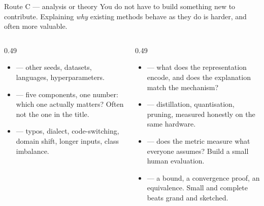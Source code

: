 \documentclass[aspectratio=169,11pt]{beamer}
\begin{document}
\begin{frame}{Route C --- analysis or theory}
You do not have to build something new to contribute. Explaining \emph{why}
existing methods behave as they do is harder, and often more valuable.

\vspace{3mm}
\begin{columns}[T]
\begin{column}{0.49\textwidth}
\footnotesize
\begin{itemize}
  \item {} --- other seeds, datasets,
        languages, hyperparameters.
  \item {} --- five components, one number: which
        one actually matters? Often not the one in the title.
  \item {} --- typos, dialect, code-switching, domain shift,
        longer inputs, class imbalance.
\end{itemize}
\end{column}
\begin{column}{0.49\textwidth}
\footnotesize
\begin{itemize}
  \item {} --- what does the representation
        encode, and does the explanation match the mechanism?
  \item {} --- distillation, quantisation, pruning, measured
        honestly on the same hardware.
  \item {} --- does the metric measure what everyone
        assumes? Build a small human evaluation.
  \item {} --- a bound, a convergence proof, an equivalence.
        Small and complete beats grand and sketched.
\end{itemize}
\end{column}
\end{columns}
\end{frame}
\end{document}
